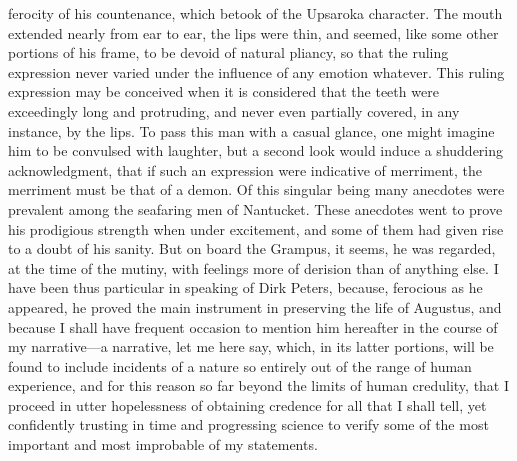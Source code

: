 ferocity of his countenance, which betook of the Upsaroka character. The mouth
extended nearly from ear to ear, the lips were thin, and seemed, like some other
portions of his frame, to be devoid of natural pliancy, so that the ruling
expression never varied under the influence of any emotion whatever. This ruling
expression may be conceived when it is considered that the teeth were
exceedingly long and protruding, and never even partially covered, in any
instance, by the lips. To pass this man with a casual glance, one might imagine
him to be convulsed with laughter, but a second look would induce a shuddering
acknowledgment, that if such an expression were indicative of merriment, the
merriment must be that of a demon. Of this singular being many anecdotes were
prevalent among the seafaring men of Nantucket. These anecdotes went to prove
his prodigious strength when under excitement, and some of them had given rise
to a doubt of his sanity. But on board the Grampus, it seems, he was regarded,
at the time of the mutiny, with feelings more of derision than of anything else.
I have been thus particular in speaking of Dirk Peters, because, ferocious as he
appeared, he proved the main instrument in preserving the life of Augustus, and
because I shall have frequent occasion to mention him hereafter in the course of
my narrative---a narrative, let me here say, which, in its latter portions, will
be found to include incidents of a nature so entirely out of the range of human
experience, and for this reason so far beyond the limits of human credulity,
that I proceed in utter hopelessness of obtaining credence for all that I shall
tell, yet confidently trusting in time and progressing science to verify some of
the most important and most improbable of my statements. 

